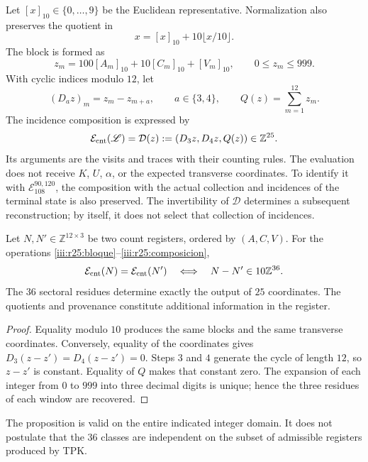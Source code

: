 Let $[x]_{10}\in\{0,\ldots,9\}$ be the Euclidean representative.
Normalization also preserves the quotient in
\[
 x=[x]_{10}+10\lfloor x/10\rfloor.
\]
The block is formed as
\begin{equation}
 z_m=100[A_m]_{10}+10[C_m]_{10}+[V_m]_{10},
 \qquad 0\leq z_m\leq999.
 \label{iii:r25:bloque}
\end{equation}
With cyclic indices modulo $12$, let
\[
 (D_a z)_m=z_m-z_{m+a},\qquad a\in\{3,4\},
 \qquad Q(z)=\sum_{m=1}^{12}z_m.
\]
The incidence composition is expressed by
\begin{equation}
 \mathcal E_{\rm cnt}(\mathscr L)
 =\mathcal D(z):=(D_3z,D_4z,Q(z))\in\mathbb Z^{25}.
 \label{iii:r25:composicion}
\end{equation}
Its arguments are the visits and traces with their counting rules.
The evaluation does not receive $K$, $U$, $\alpha$, or the expected
transverse coordinates. To identify it with
$\mathcal E_{108}^{90,120}$, the composition with the actual
collection and incidences of the terminal state is also preserved. The
invertibility of $\mathcal D$ determines a subsequent reconstruction;
by itself, it does not select that collection of incidences.

\begin{proposition}
\label{iii:r25:residuos}
Let $N,N'\in\mathbb Z^{12\times3}$ be two count registers,
ordered by $(A,C,V)$. For the operations
\eqref{iii:r25:bloque}--\eqref{iii:r25:composicion},
\[
 \mathcal E_{\rm cnt}(N)=\mathcal E_{\rm cnt}(N')
 \quad\Longleftrightarrow\quad N-N'\in10\mathbb Z^{36}.
\]
The $36$ sectoral residues determine exactly the output of
$25$ coordinates. The quotients and provenance constitute
additional information in the register.
\end{proposition}
\begin{proof}
Equality modulo $10$ produces the same blocks and the same
transverse coordinates. Conversely, equality of the
coordinates gives $D_3(z-z')=D_4(z-z')=0$. Steps $3$ and $4$
generate the cycle of length $12$, so $z-z'$ is constant.
Equality of $Q$ makes that constant zero. The expansion of each integer
from $0$ to $999$ into three decimal digits is unique; hence
the three residues of each window are recovered.
\end{proof}

The proposition is valid on the entire indicated integer domain. It
does not postulate that the $36$ classes are independent on the subset
of admissible registers produced by TPK.

